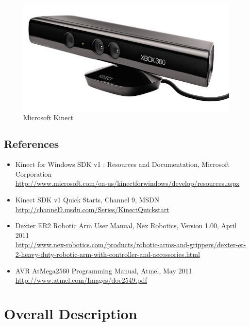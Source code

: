 \documentclass[a4wide]{scrreprt}
\begin{document}
\begin{figure}[H]
\centering
\includegraphics[scale=0.6]{kinect.jpg}
\caption{Microsoft Kinect} 
\end{figure}



\section{References}
\begin{itemize}
\item Kinect for Windows SDK v1 : Resources and Documentation, Microsoft Corporation\\ \url{http://www.microsoft.com/en-us/kinectforwindows/develop/resources.aspx}
\item Kinect SDK v1 Quick Starts, Channel 9, MSDN\\ \url{http://channel9.msdn.com/Series/KinectQuickstart} 
\item Dexter ER2 Robotic Arm User Manual, Nex Robotics, Version 1.00, April 2011\\ \url{http://www.nex-robotics.com/products/robotic-arms-and-grippers/dexter-er-2-heavy-duty-robotic-arm-with-controller-and-accessories.html}
\item AVR AtMega2560 Programming Manual, Atmel, May 2011 \\ \url{http://www.atmel.com/Images/doc2549.pdf}
\end{itemize}

\chapter{Overall Description}
\end{document}
